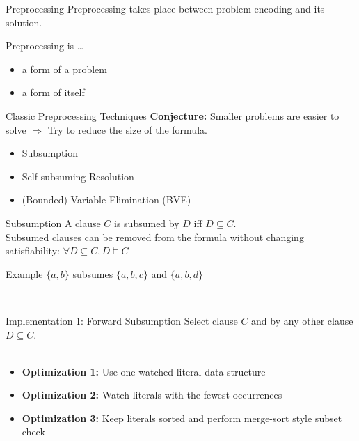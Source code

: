 \documentclass[t]{sdqbeamer}
\begin{document}
\begin{frame}{Preprocessing}
Preprocessing takes place between problem encoding and its solution.\\[1ex]
\begin{block}{Preprocessing is \dots}
\begin{itemize}
    \item a form of  a problem
    \item a form of  itself
\end{itemize}
\end{block}
\begin{exampleblock}{Classic Preprocessing Techniques}
\textbf{Conjecture:} Smaller problems are easier to solve $\Longrightarrow$ Try to reduce the size of the formula.\\[1ex]
\begin{itemize}\setlength{\itemsep}{1ex}
    \item Subsumption
    \item Self-subsuming Resolution
    \item (Bounded) Variable Elimination (BVE)
\end{itemize}
\end{exampleblock}
\end{frame}


\begin{frame}{Subsumption}
A clause $C$ is subsumed by $D$ iff $D \subseteq C$.\\[1ex]
Subsumed clauses can be removed from the formula without changing satisfiability: $\forall D \subseteq C, D \models C$
\begin{exampleblock}{Example}
    $\{a, b\}$ subsumes $\{a, b, c\}$ and $\{a, b, d\}$
\end{exampleblock}~\\
\pause
\begin{block}{Implementation 1: Forward Subsumption}
Select clause $C$ and  by any other clause $D \subseteq C$.~\\[1ex]
\pause
~\\[1ex]
\begin{itemize}\setlength{\itemsep}{1ex}
    \item \textbf{Optimization 1:} Use one-watched literal data-structure
    \item \textbf{Optimization 2:} Watch literals with the fewest occurrences
    \item \textbf{Optimization 3:} Keep literals sorted and perform merge-sort style subset check
\end{itemize}
\end{block}
\end{frame}
\end{document}
